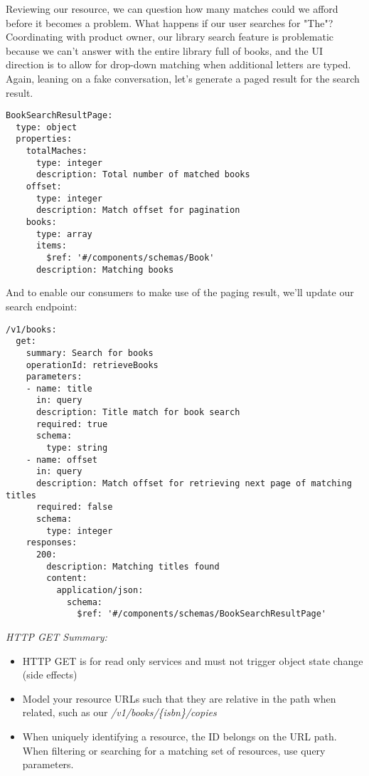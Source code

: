 Reviewing our resource, we can question how many matches could we afford before it becomes a problem.  What happens if our user searches for "The"?  Coordinating with product owner, our library search feature is problematic because we can't answer with the entire library full of books, and the UI direction is to allow for drop-down matching when additional letters are typed.  Again, leaning on a fake conversation, let's generate a paged result for the search result.

\begin{minipage}{\linewidth}

\begin{code}
\begin{lstlisting}[belowskip=-\baselineskip]
BookSearchResultPage:
  type: object
  properties:
    totalMaches:
      type: integer
      description: Total number of matched books
    offset:
      type: integer
      description: Match offset for pagination
    books:
      type: array
      items:
        $ref: '#/components/schemas/Book'
      description: Matching books
\end{lstlisting}
\end{code}
\end{minipage}

And to enable our consumers to make use of the paging result, we'll update our search endpoint:

\begin{minipage}{\linewidth}
\begin{code}
\begin{lstlisting}[belowskip=-\baselineskip]
/v1/books:
  get:
    summary: Search for books
    operationId: retrieveBooks
    parameters:
    - name: title
      in: query
      description: Title match for book search
      required: true
      schema:
        type: string
    - name: offset
      in: query
      description: Match offset for retrieving next page of matching titles
      required: false
      schema:
        type: integer
    responses:
      200:
        description: Matching titles found
        content:
          application/json:
            schema:
              $ref: '#/components/schemas/BookSearchResultPage'
\end{lstlisting}
\end{code}
\end{minipage}

\emph{HTTP GET Summary:}

\begin{itemize}
  \item HTTP GET is for read only services and must not trigger object state change (side effects)
  \item Model your resource URLs such that they are relative in the path when related, such as our \textit{/v1/books/\{isbn\}/copies}
  \item When uniquely identifying a resource, the ID belongs on the URL path.  When filtering or searching for a matching set of resources, use query parameters.
\end{itemize}
